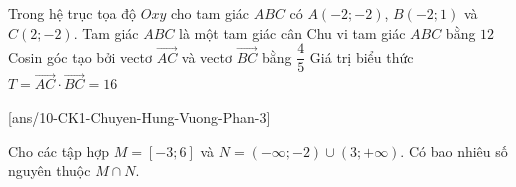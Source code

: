 \begin{ex}
\begin{ex}%
Trong hệ trục tọa độ $Oxy$ cho tam giác $ABC$ có $A(-2;-2)$, $B(-2; 1)$ và $C(2;-2)$.
\choiceTF
{Tam giác $ABC$ là một tam giác cân}
{\True Chu vi tam giác $ABC$ bằng $12$}
{\True Cosin góc tạo bởi vectơ $\overrightarrow{AC}$ và vectơ $\overrightarrow{BC}$ bằng $\dfrac{4}{5}$}
{\True Giá trị biểu thức $T=\overrightarrow{AC} \cdot \overrightarrow{BC}=16$}
\end{ex}



\caukq
{}[ans/10-CK1-Chuyen-Hung-Vuong-Phan-3]
\begin{ex}%
Cho các tập hợp $ M=[-3; 6]$ và $N=(-\infty;-2) \cup(3;+\infty)$. Có bao nhiêu số nguyên thuộc $ M \cap N$.
\end{ex}


\end{ex}
